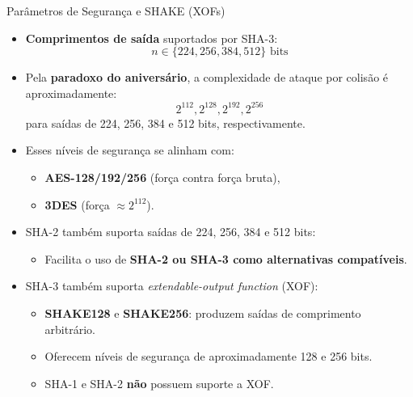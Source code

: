 \documentclass{beamer}
\begin{document}
\begin{frame}{Parâmetros de Segurança e SHAKE (XOFs)}
  \begin{itemize}
    \item \textbf{Comprimentos de saída} suportados por SHA-3:
      \[
        n \in \{224, 256, 384, 512\} \text{ bits}
      \]
    \item Pela \textbf{paradoxo do aniversário}, a complexidade de ataque por colisão é aproximadamente:
      \[
        2^{112}, 2^{128}, 2^{192}, 2^{256}
      \]
      para saídas de 224, 256, 384 e 512 bits, respectivamente.
    \item Esses níveis de segurança se alinham com:
      \begin{itemize}
        \item \textbf{AES-128/192/256} (força contra força bruta),
        \item \textbf{3DES} (força $\approx 2^{112}$).
      \end{itemize}
    \item SHA-2 também suporta saídas de 224, 256, 384 e 512 bits:
      \begin{itemize}
        \item Facilita o uso de \textbf{SHA-2 ou SHA-3 como alternativas compatíveis}.
      \end{itemize}
    \item SHA-3 também suporta \textit{extendable-output function} (XOF):
      \begin{itemize}
        \item \textbf{SHAKE128} e \textbf{SHAKE256}: produzem saídas de comprimento arbitrário.
        \item Oferecem níveis de segurança de aproximadamente 128 e 256 bits.
        \item SHA-1 e SHA-2 \textbf{não} possuem suporte a XOF.
      \end{itemize}
  \end{itemize}
\end{frame}
\end{document}
